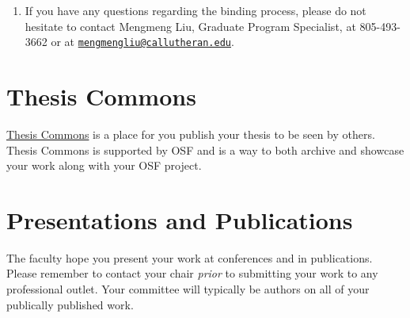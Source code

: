 \documentclass[]{book}
\providecommand{\tightlist}{%
  \setlength{\itemsep}{0pt}\setlength{\parskip}{0pt}}
\begin{document}
\begin{enumerate}
\def\labelenumi{\arabic{enumi}.}
\setcounter{enumi}{4}
\tightlist
\item
  If you have any questions regarding the binding process, please do not hesitate to contact Mengmeng Liu, Graduate Program Specialist, at 805-493-3662 or at \href{mailto:mengmengliu@callutheran.edu}{\nolinkurl{mengmengliu@callutheran.edu}}.
\end{enumerate}

\hypertarget{thesis-commons}{%
\chapter{Thesis Commons}\label{thesis-commons}}

\href{https://thesiscommons.org/}{Thesis Commons} is a place for you publish your thesis to be seen by others. Thesis Commons is supported by OSF and is a way to both archive and showcase your work along with your OSF project.

\hypertarget{presentations-and-publications}{%
\chapter{Presentations and Publications}\label{presentations-and-publications}}

The faculty hope you present your work at conferences and in publications. Please remember to contact your chair \emph{prior} to submitting your work to any professional outlet. Your committee will typically be authors on all of your publically published work.


\end{document}
